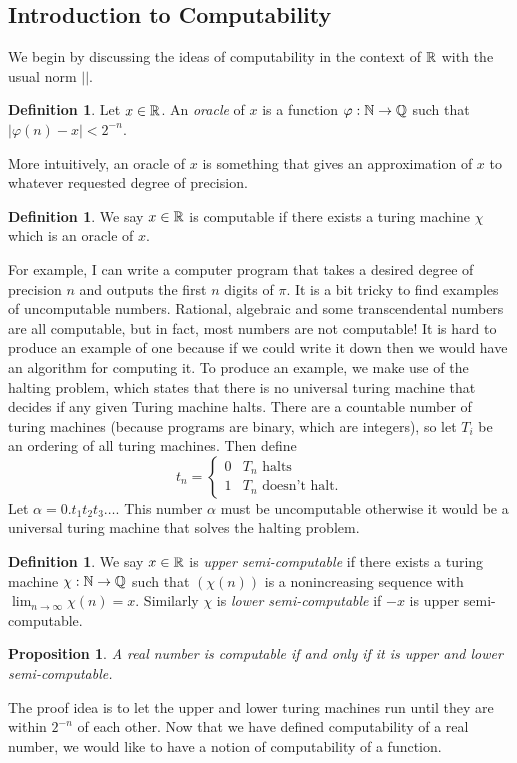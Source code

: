 \documentclass[11pt, reqno]{amsart}
\theoremstyle{plain}
\numberwithin{thm}{subsection}
\newtheorem{prop}[thm]{Proposition}
\theoremstyle{definition}
\newtheorem{defn}[thm]{Definition}
\begin{document}
\subsection{Introduction to Computability}\cite[L6, L7]{wolf}   
We begin by discussing the ideas of computability in the context of $\mathbb{R}$ with the usual norm $||$. 
\begin{defn}
  Let $x \in \mathbb{R}$. An \textit{oracle} of $x$ is a function $\varphi: \mathbb{N} \rightarrow \mathbb{Q}$ such that $|\varphi(n) - x|< 2^{-n}$. 
\end{defn}
More intuitively, an oracle of $x$ is something that gives an approximation of $x$ to whatever requested degree of precision.
\begin{defn}
  We say $x \in \mathbb{R}$ is computable if there exists a turing machine $\chi$ which is an oracle of $x$. 
\end{defn}
For example, I can write a computer program that takes a desired degree of precision $n$ and outputs the first $n$ digits of $\pi$. It is a bit tricky to find examples of uncomputable numbers. Rational, algebraic and some transcendental numbers are all computable, but in fact, most numbers are not computable! It is hard to produce an example of one because if we could write it down then we would have an algorithm for computing it. To produce an example, we make use of the halting problem, which states that there is no universal turing machine that decides if any given Turing machine halts. There are a countable number of turing machines (because programs are binary, which are integers), so let $T_i$ be an ordering of all turing machines. Then define $$t_n = \begin{cases}
  0 & T_n \text{ halts} \\
  1 & T_n \text{ doesn't halt.}
\end{cases}$$ Let $\alpha = 0.t_1t_2t_3\dots$. This number $\alpha$ must be uncomputable otherwise it would be a universal turing machine that solves the halting problem. 

\begin{defn}
  We say $x \in \mathbb{R}$ is \textit{upper semi-computable} if there exists a turing machine $\chi: \mathbb{N} \rightarrow \mathbb{Q}$ such that $(\chi(n))$ is a nonincreasing sequence with $\lim_{n \rightarrow \infty} \chi(n) = x$.
  Similarly $\chi$ is \textit{lower semi-computable} if $-x$ is upper semi-computable.
\end{defn}

\begin{prop}
  A real number is computable if and only if it is upper and lower semi-computable.
\end{prop}
The proof idea is to let the upper and lower turing machines run until they are within $2^{-n}$ of each other. Now that we have defined computability of a real number, we would like to have a notion of computability of a function.
\end{document}
